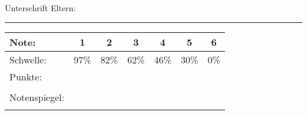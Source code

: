 {	\vspace{1cm}
	Unterschrift Eltern: \rule[0ex]{5cm}{1pt}
	\vspace{1cm}
	\renewcommand{\arraystretch}{1}
	{
		\begin{center}
		\begin{tabular}{|l||c|c|c|c|c|c|}
			\hline
			Note: & 1&2&3&4&5&6\\\hline
			Schwelle:& 97\% & 82\% & 62\% & 46\% & 30\% & 0\% \\\hline
			Punkte:& \fpeval{round(2*0.97*\value{gesamt})/2} & \fpeval{round(2*0.82*\value{gesamt})/2} & \fpeval{round(2*0.62*\value{gesamt})/2} & \fpeval{round(2*0.46*\value{gesamt})/2} & \fpeval{round(2*0.3*\value{gesamt})/2} & \fpeval{round(2*0.0*\value{gesamt})/2} \\\hline
			& & & & & &  \\
			Notenspiegel: & & & & & & \\ 
			& & & & & & \\\hline
		\end{tabular}
	\end{center}
	}
}{\noalign}